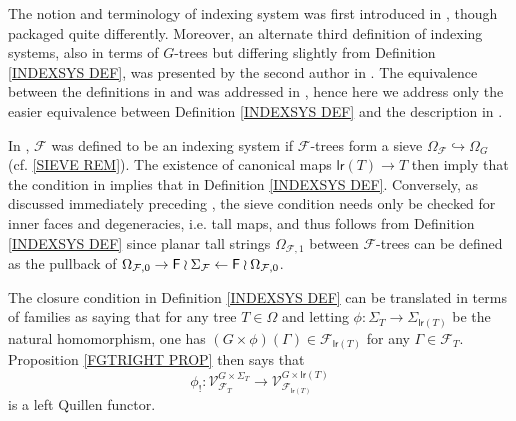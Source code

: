 \documentclass[a4paper,10pt]{article}%
\begin{document}
\begin{remark}
The notion and terminology of indexing system
was first introduced in \cite[Def. 3.22]{BH15}, though packaged quite differently.
Moreover, an alternate third definition of indexing systems, also in terms of $G$-trees but differing slightly from Definition \ref{INDEXSYS DEF}, was presented by the second author in \cite[\S 9]{Pe17}. The equivalence between the definitions in \cite{BH15} and \cite{Pe17} was addressed in 
\cite[Rmk. 9.7]{Pe17}, hence here we address only the easier equivalence between Definition \ref{INDEXSYS DEF} and the description in \cite[\S 9]{Pe17}.

In \cite[Def. 9.5]{Pe17}, $\mathcal{F}$ was defined to be an indexing system if $\mathcal{F}$-trees form a sieve
$\Omega_{\mathcal{F}} \hookrightarrow \Omega_G$ 
(cf. \ref{SIEVE REM}). The existence of canonical maps 
$\mathsf{lr}(T) \to T$ then imply that the condition in 
\cite[Def. 9.5]{Pe17} implies that in Definition \ref{INDEXSYS DEF}. 
Conversely, as discussed immediately preceding \cite[Def. 9.5]{Pe17}, the sieve condition needs only be checked for inner faces and degeneracies, i.e. tall maps, and thus follows from Definition \ref{INDEXSYS DEF} since 
planar tall strings $\Omega_{\mathcal{F},1}$ between $\mathcal{F}$-trees can be defined as the pullback of 
$\Omega_{\mathcal{F},0} \to
\mathsf{F} \wr \Sigma_{\mathcal{F}} \leftarrow 
\mathsf{F} \wr \Omega_{\mathcal{F},0}
$.
\end{remark}

\begin{remark}
The closure condition in 
Definition \ref{INDEXSYS DEF}
can be translated in terms of families as saying that for any tree $T \in \Omega$ and letting 
$\phi \colon \Sigma_T \to \Sigma_{\mathsf{lr}(T)}$ 
be the natural homomorphism, one has
$(G \times \phi)(\Gamma) \in \mathcal{F}_{\mathsf{lr}(T)}$
for any $\Gamma \in \mathcal{F}_{T}$. 
Proposition \ref{FGTRIGHT PROP} then says that
\begin{equation}\label{LRLEFTQUILLEN EQ}
	\phi_{!}
		\colon
	\mathcal{V}^{G\times \Sigma_T}_{\mathcal{F}_T}
		\to
	\mathcal{V}^{G\times \mathsf{lr}(T)}
	_{\mathcal{F}_{\mathsf{lr}(T)}}
\end{equation}
is a left Quillen functor.
\end{remark}
\end{document}
